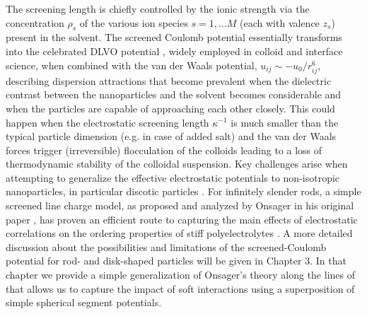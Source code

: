\documentclass[amssymb]{revtex4}
\begin{document}
\noindent The screening length is chiefly controlled by the ionic strength via the concentration $\rho_{s}$ of the various ion species $s=1, \dots M$ (each with valence $z_{s}$)  present in the solvent.  
The screened Coulomb potential essentially transforms into the celebrated DLVO potential \cite{verwey1955theory}, widely employed in colloid and interface science, when combined with the  van der Waals potential,  $u_{ij} \sim -u_{0}/r_{ij}^{6}$, describing dispersion attractions that become prevalent when the dielectric contrast between the nanoparticles and the solvent becomes considerable and when the particles are capable of approaching each other closely. This could happen when the electrostatic screening length $\kappa^{-1}$ is much smaller than the typical particle dimension (e.g. in case of added salt) and the van der Waals forces trigger (irreversible) flocculation of the colloids leading to a loss of thermodynamic stability of the colloidal suspension.  
Key challenges arise when attempting to generalize the effective electrostatic potentials to non-isotropic nanoparticles, in particular discotic particles \cite{trizac-weis}. For infinitely slender rods, a simple screened line charge model, as proposed and analyzed by Onsager in his original paper \cite{onsager}, has proven an efficient route to capturing the main effects of electrostatic correlations on the ordering properties of stiff polyelectrolytes \cite{stroobants_mm1986}.   A more detailed discussion about the possibilities and limitations of the screened-Coulomb potential for rod- and disk-shaped particles will be given in Chapter 3. 
In that chapter we provide a simple generalization of Onsager's theory along the lines of  that allows us to capture the impact of soft interactions using a superposition of simple spherical segment potentials.
\end{document}
